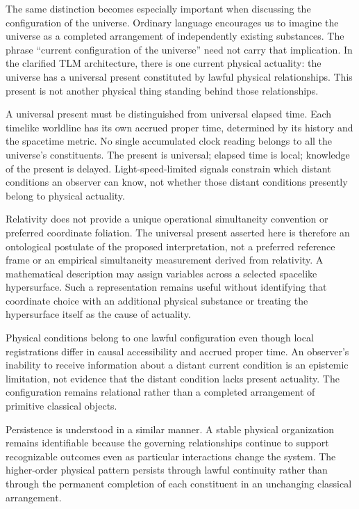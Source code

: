 \documentclass[12pt,onecolumn]{article}
\begin{document}
The same distinction becomes especially important when discussing the configuration of the universe. Ordinary language encourages us to imagine the universe as a completed arrangement of independently existing substances. The phrase ``current configuration of the universe'' need not carry that implication. In the clarified TLM architecture, there is one current physical actuality: the universe has a universal present constituted by lawful physical relationships. This present is not another physical thing standing behind those relationships.

A universal present must be distinguished from universal elapsed time. Each timelike worldline has its own accrued proper time, determined by its history and the spacetime metric. No single accumulated clock reading belongs to all the universe's constituents. The present is universal; elapsed time is local; knowledge of the present is delayed. Light-speed-limited signals constrain which distant conditions an observer can know, not whether those distant conditions presently belong to physical actuality.

Relativity does not provide a unique operational simultaneity convention or preferred coordinate foliation. The universal present asserted here is therefore an ontological postulate of the proposed interpretation, not a preferred reference frame or an empirical simultaneity measurement derived from relativity. A mathematical description may assign variables across a selected spacelike hypersurface. Such a representation remains useful without identifying that coordinate choice with an additional physical substance or treating the hypersurface itself as the cause of actuality.

Physical conditions belong to one lawful configuration even though local registrations differ in causal accessibility and accrued proper time. An observer's inability to receive information about a distant current condition is an epistemic limitation, not evidence that the distant condition lacks present actuality. The configuration remains relational rather than a completed arrangement of primitive classical objects.

Persistence is understood in a similar manner. A stable physical organization remains identifiable because the governing relationships continue to support recognizable outcomes even as particular interactions change the system. The higher-order physical pattern persists through lawful continuity rather than through the permanent completion of each constituent in an unchanging classical arrangement.
\end{document}
